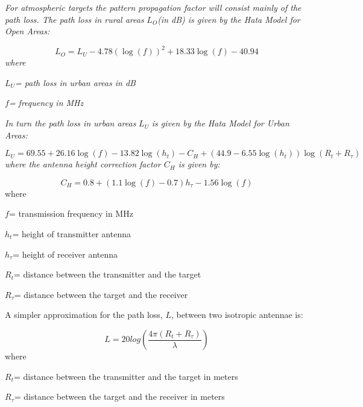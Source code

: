 \documentclass[a4paper]{report}
\newcommand\textstyleEmphasis[1]{\textit{#1}}
\numberwithin{equation}{chapter}
\begin{document}
\bigskip

\textstyleEmphasis{\textup{For atmospheric targets the pattern
propagation factor will consist mainly of the path loss. The path loss
in rural areas }}$L_{O}$\textstyleEmphasis{\textup{(in dB) is given by
the Hata Model for Open Areas:}}

\begin{equation}
L_{O}=L_{U}-4.78\left(\log (f)\right)^{2}+18.33\log (f)-40.94
\end{equation}
\textstyleEmphasis{\textup{where}}

 $L_{U}$\textstyleEmphasis{\textup{= path loss in urban areas in dB}}

 $f$\textstyleEmphasis{\textup{= frequency in MHz}}

\bigskip

\textstyleEmphasis{\textup{In turn the path loss in urban areas }}
$L_{U}$ \textstyleEmphasis{\textup{is given by the Hata Model for Urban
Areas:}}

\begin{equation}
L_{U}=69.55+26.16\log (f)-13.82\log (h_{t})-C_{H}+\left(44.9-6.55\log(h_{t})\right)\log (R_{t}+R_{\tau })
\end{equation}
\textstyleEmphasis{\textup{where the antenna height correction factor $C_{H}$ is given by:}}

\begin{equation}
C_{H}=0.8+\left(1.1\log (f)-0.7\right)h_{\tau}-1.56\log (f)
\end{equation}
where

 $f$= transmission frequency in MHz

 $h_{t}$= height of transmitter antenna

 $h_{\tau}$= height of receiver antenna

 $R_{t}$= distance between the transmitter and the target

 $R_{\tau }$= distance between the target and the receiver

\bigskip

A simpler approximation for the path loss, $L$, between two isotropic antennae is:

\begin{equation}
L=20 log\left(\frac{4 \pi \left(R_{t} + R_{\tau}\right)}{\lambda}\right)
\end{equation}
where

 $R_{t}$= distance between the transmitter and the target in meters

 $R_{\tau}$= distance between the target and the receiver in meters
\end{document}
